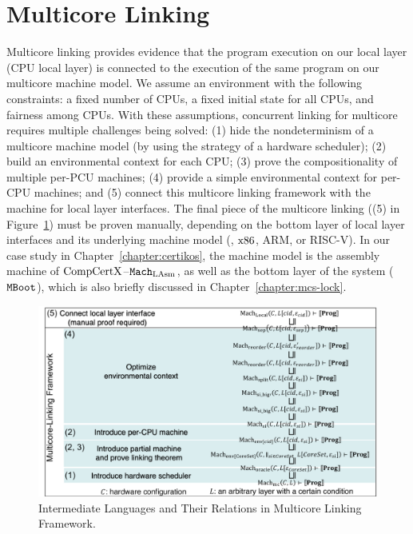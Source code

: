 \section{Multicore Linking}
\label{chapter:linking:sec:multicore-linking}

Multicore linking provides evidence that the program execution on our local layer (CPU local layer) is connected to the execution of the same program on our multicore machine model. 
We assume an environment with the following constraints: 
a fixed number of CPUs, a fixed initial state for all CPUs, and fairness among CPUs. 
With these assumptions, concurrent linking for multicore requires multiple challenges being solved: 
(1) hide the nondeterminism of a multicore machine model (by using the strategy of a hardware scheduler); 
(2) build an environmental context for each CPU; 
(3) prove the compositionality of multiple per-PCU machines; 
(4) provide a simple environmental context for per-CPU machines; and 
(5) connect this multicore linking framework with the machine for  local layer interfaces. The final piece of the multicore linking ((5) in Figure~\ref{fig:chapter:conlink:intermediate-languages-and-their-relationsihps-for-multicore-linking}) 
must be proven manually, depending on the bottom layer of local layer interfaces and its underlying machine model (\ie, $\mathrm{x86}$, ARM, or RISC-V). In our case study in Chapter~\ref{chapter:certikos}, the machine model is the assembly machine of $\mathrm{CompCertX}$--${\mathrm{\texttt{Mach}}}_{\mathrm{LAsm}}$, as well as the bottom layer of the system (${\mathrm{\texttt{MBoot}}}$), which is also briefly discussed in Chapter~\ref{chapter:mcs-lock}.
\begin{figure}
\begin{center}
\includegraphics[width=\textwidth, page=1]{figs/conlink/concurrent_linking}
\end{center}
\caption{Intermediate Languages and Their Relations in Multicore Linking Framework.}
\label{fig:chapter:conlink:intermediate-languages-and-their-relationsihps-for-multicore-linking}
\end{figure}
